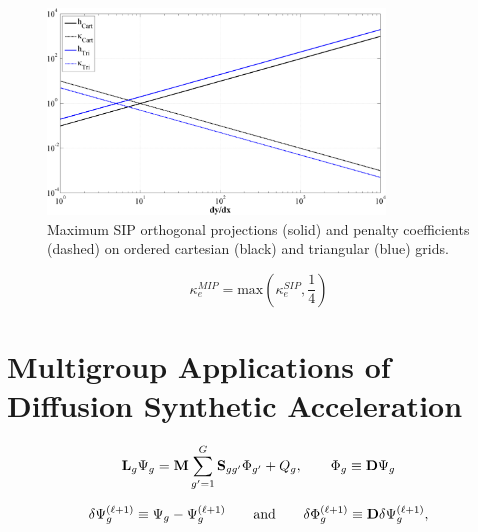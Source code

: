 \begin{figure}
\centering
\label{fig::IP_coefficient_degradation}
\includegraphics[width=0.8\textwidth]{figures/sec_DSA/IP_penalty_coeff.png}
\caption{Maximum SIP orthogonal projections (solid) and penalty coefficients (dashed) on ordered cartesian (black) and triangular (blue) grids. }
\end{figure}

\begin{equation}
\label{eq::MIP_penalty_term}
\kappa_e^{MIP} = \text{max} \left( \kappa_e^{SIP}, \frac{1}{4} \right)
\end{equation}

\section{Multigroup Applications of Diffusion Synthetic Acceleration}
\label{sec::DSA_MG}

\begin{equation}
\label{eq::DSA_MG::mg_trans_op}
{\bf L}_g \Psi_g =  {\bf M} \sum_{g'=1}^{G} {\bf S}_{gg'} \Phi_{g'} + Q_g, \qquad \Phi_g \equiv  {\bf D} \Psi_g
\end{equation}


\begin{equation}
\label{eq::DSA_MG::mg_error_terms}
\delta \Psi_g^{(\ell+1)} \equiv \Psi_g - \Psi_g^{(\ell+1)} \qquad \text{and} \qquad \delta \Phi_g^{(\ell+1)} \equiv  {\bf D} \delta \Psi_g^{(\ell+1)},
\end{equation}

